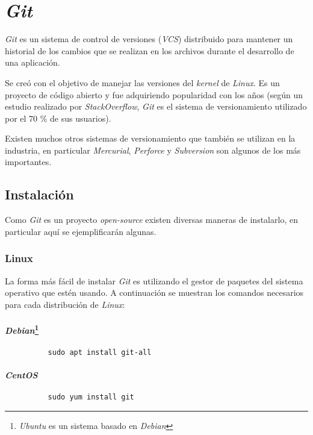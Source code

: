 \chapter{\textit{Git}}
  \textit{Git} es un sistema de control de versiones (\textit{VCS}) distribuido para 
  mantener un historial de los cambios que se realizan en los archivos durante el 
  desarrollo de una aplicación.

  Se creó con el objetivo de manejar las versiones del \textit{kernel} de \textit{Linux}.
  Es un proyecto de código abierto y fue adquiriendo popularidad con los años (según un 
  estudio realizado por \textit{StackOverflow}, \textit{Git} es el sistema de 
  versionamiento utilizado por el 70 \% de sus usuarios).
  
  Existen muchos otros sistemas de versionamiento que también se utilizan en la industria,
  en particular \textit{Mercurial}, \textit{Perforce} y \textit{Subversion} son algunos de 
  los más importantes.

  \section{Instalación}
    Como \textit{Git} es un proyecto \textit{open-source} existen diversas maneras de 
    instalarlo, en particular aquí se ejemplificarán algunas.

    \subsection{Linux}
      La forma más fácil de instalar \textit{Git} es utilizando el gestor de paquetes del
      sistema operativo que estén usando.
      A continuación se muestran los comandos necesarios para cada distribución de 
      \textit{Linux}:

      \subsubsection{
        \textit{Debian}\footnote{\textit{Ubuntu} es un sistema basado en \textit{Debian}}
      }
        \begin{verbatim}
          sudo apt install git-all 
        \end{verbatim}

      \subsubsection{\textit{CentOS}}
        \begin{verbatim}
          sudo yum install git
        \end{verbatim}

